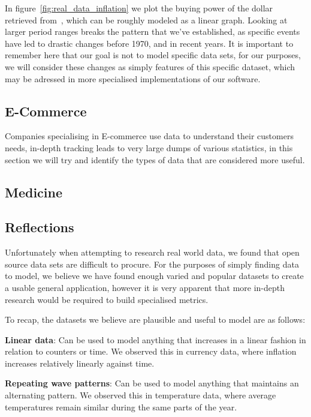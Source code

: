 In figure~\ref{fig:real_data_inflation} we plot the buying power of the dollar retrieved
from~\cite{officialdataCPIInflationUS}, which can be roughly modeled as a linear graph.
Looking at larger period ranges breaks the pattern that we've established, as specific events have led to drastic
changes before 1970, and in recent years.
It is important to remember here that our goal is not to model specific data sets, for our purposes, we will consider
these changes as simply features of this specific dataset, which may be adressed in more specialised implementations of
our software.

\subsection{E-Commerce}

Companies specialising in E-commerce use data to understand their customers needs, in-depth tracking leads to very large
dumps of various statistics, in this section we will try and identify the types of data that are considered more useful.

\subsection{Medicine}

\subsection{Reflections}

Unfortunately when attempting to research real world data, we found that open source data sets are difficult to procure.
For the purposes of simply finding data to model, we believe we have found enough varied and popular datasets to
create a usable general application, however it is very apparent that more in-depth research would be required to build
specialised metrics.


To recap, the datasets we believe are plausible and useful to model are as follows:

\textbf{Linear data}: Can be used to model anything that increases in a linear fashion in relation to counters or time.
We observed this in currency data, where inflation increases relatively linearly against time.

\textbf{Repeating wave patterns}: Can be used to model anything that maintains an alternating pattern.
We observed this in temperature data, where average temperatures remain similar during the same parts of the year.